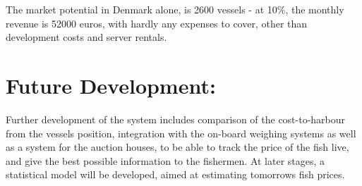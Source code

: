 \documentclass[10pt,stdletter,dateno,sigleft]{newlfm} %
\begin{document}
\begin{newlfm}
The market potential in Denmark alone, is 2600 vessels - at 10\%, the monthly revenue is 52000 euros, with hardly any expenses to cover, other than development costs and server rentals.\\

\section{Future Development:}
Further development of the system includes comparison of the cost-to-harbour from the vessels position, integration with the on-board weighing systems as well as a system for the auction houses, to be able to track the price of the fish live, and give the best possible information to the fishermen. At later stages, a statistical model will be developed, aimed at estimating tomorrows fish prices.\\
\\
\\



\end{newlfm}
\end{document}
